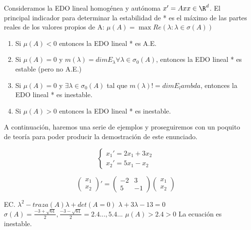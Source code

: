 Consideramos la EDO lineal homogénea y autónoma $x'=Ax x\in\R^d$. El principal indicador para determinar la estabilidad de * es el máximo de las partes reales de los valores propios de A:
$\mu(A)=\max{Re(\lambda : \lambda\in\sigma(A))}$

\begin{nth}
\begin{enumerate}
\item Si $\mu(A)<0$ entonces la EDO lineal * es A.E.
\item Si $\mu(A)=0$ y $m(\lambda)=dimE_\lambda \forall \lambda \in \sigma_0(A)$, entonces la EDO lineal * es estable (pero no A.E.)
\item Si $\mu(A)=0$ y $\exists \lambda \in \sigma_0(A)$ tal que $m(\lambda) != dim E_lambda$, entonces la EDO lineal * es inestable.
\item Si $\mu(A)>0$ entonces la EDO lineal * es inestable.
\end{enumerate}
\end{nth}

A continuación, haremos una serie de ejemplos y proseguiremos con un poquito de teoría para poder producir la demostración de este enunciado.\\
\begin{ejemplo}
\begin{equation}
\left\{\begin{array}{lcl}
x_1'=2x_1+3x_2\\
x_2'=5x_1-x_2
\end{array}\right.
\end{equation}

\begin{equation}
\begin{pmatrix}
x_1 \\
x_2
\end{pmatrix}'=
\begin{pmatrix}
-2 & 3\\
5 & -1
\end{pmatrix}
\begin{pmatrix}
x_1 \\
x_2
\end{pmatrix}
\end{equation}


EC. $\lambda^2-traza(A)\lambda + det(A=0)$
$\lambda+3\lambda-13=0$
$\sigma(A)={\frac{-3+\sqrt{61}}{2},\frac{-3-\sqrt{61}}{2}}={2.4...,5.4...}$
$\mu(A)>2.4 >0$
La ecuación es inestable.
\end{ejemplo}


